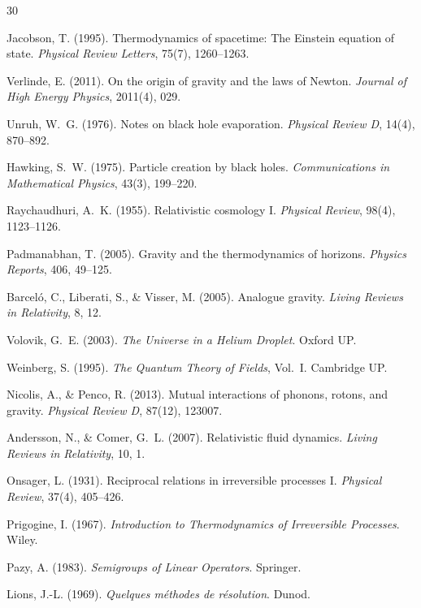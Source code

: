 \documentclass[12pt, oneside]{book}
\theoremstyle{plain}
\theoremstyle{definition}
\begin{document}
\begin{thebibliography}{30}

Jacobson, T. (1995). Thermodynamics of spacetime: The Einstein equation of state.
\textit{Physical Review Letters}, 75(7), 1260--1263.

Verlinde, E. (2011). On the origin of gravity and the laws of Newton.
\textit{Journal of High Energy Physics}, 2011(4), 029.

Unruh, W.~G. (1976). Notes on black hole evaporation.
\textit{Physical Review D}, 14(4), 870--892.

Hawking, S.~W. (1975). Particle creation by black holes.
\textit{Communications in Mathematical Physics}, 43(3), 199--220.

Raychaudhuri, A.~K. (1955). Relativistic cosmology I.
\textit{Physical Review}, 98(4), 1123--1126.

Padmanabhan, T. (2005). Gravity and the thermodynamics of horizons.
\textit{Physics Reports}, 406, 49--125.

Barcel\'o, C., Liberati, S., \& Visser, M. (2005). Analogue gravity.
\textit{Living Reviews in Relativity}, 8, 12.

Volovik, G.~E. (2003). \textit{The Universe in a Helium Droplet}. Oxford UP.

Weinberg, S. (1995). \textit{The Quantum Theory of Fields}, Vol.~I. Cambridge UP.

Nicolis, A., \& Penco, R. (2013). Mutual interactions of phonons, rotons, and
gravity. \textit{Physical Review D}, 87(12), 123007.

Andersson, N., \& Comer, G.~L. (2007). Relativistic fluid dynamics.
\textit{Living Reviews in Relativity}, 10, 1.

Onsager, L. (1931). Reciprocal relations in irreversible processes I.
\textit{Physical Review}, 37(4), 405--426.

Prigogine, I. (1967). \textit{Introduction to Thermodynamics of Irreversible
Processes}. Wiley.

Pazy, A. (1983). \textit{Semigroups of Linear Operators}. Springer.

Lions, J.-L. (1969). \textit{Quelques m\'ethodes de r\'esolution}. Dunod.


\end{thebibliography}
\end{document}
